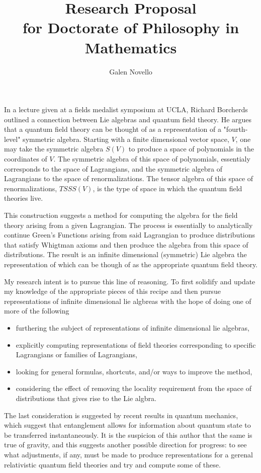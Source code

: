 \documentclass[11pt]{article} %
\title{Research Proposal\\
 for Doctorate of Philosophy in Mathematics}
\author{Galen Novello}
\begin{document}
\maketitle

In a lecture given at a fields medalist symposium at UCLA, Richard Borcherds outlined a connection between Lie algebras and quantum field theory.  He argues that a quantum field theory can be thought of as a representation of a "fourth-level" symmetric algebra. Starting with a finite dimensional vector space, $V$, one may take the symmetric algebra $S(V)$ to produce a space of polynomials in the coordinates of $V$.  The symmetric algebra of this space of polynomials, essentialy corresponds to the space of Lagrangians, and the symmetric algebra of Lagrangians to the space of renormalizations.  The tensor algebra of this space of renormalizations, $TSSS(V)$, is the type of space in which the quantum field theories live.   

This construction suggests a method for computing the algebra for the field theory arising from a given Lagrangian. The process is essentially to analytically continue Green's Functions arising from said Lagrangian to produce distributions that satisfy Whigtman axioms and then produce the algebra from this space of distributions.  The result is an infinite dimensional (symmetric) Lie algebra the representation of which can be though of as the appropriate quantum field theory.

My research intent is to pursue this line of reasoning.  To first solidify and update my knowledge of the appropriate pieces of this recipe and then pursue representations of infinite dimensional lie algbreas with the hope of doing one of more of the following 
\begin{itemize}
\item furthering the subject of representations of infinite dimensional lie algebras,
\item explicitly computing representations of field theories corresponding to specific Lagrangians or families of Lagrangians,
\item looking for general formulas, shortcuts, and/or ways to improve the method,
\item considering the effect of removing the locality requirement from the space of distributions that gives rise to the Lie algbra. 

\end{itemize}

The last consideration is suggested by recent results in quantum mechanics, which suggest that entanglement allows for information about quantum state to be transferred instantaneously. It is the suspicion of this author that the same is true of gravity, and this suggests another possible direction for progress: to see what adjustments, if any, must be made to produce representations for a gerenal relativistic quantum field theories and try and compute some of these. 
\end{document}
